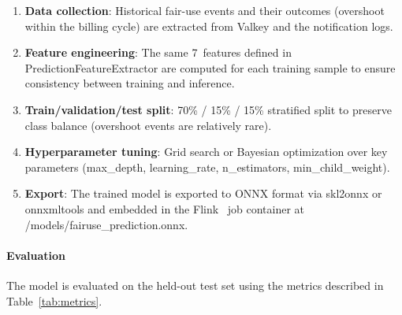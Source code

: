 \begin{enumerate}
    \item \textbf{Data collection}: Historical fair-use events and their outcomes (overshoot within
    the billing cycle) are extracted from Valkey and the notification logs.
    \item \textbf{Feature engineering}: The same 7~features defined in PredictionFeatureExtractor
    are computed for each training sample to ensure consistency between training and inference.
    \item \textbf{Train/validation/test split}: 70\% / 15\% / 15\% stratified split to preserve
    class balance (overshoot events are relatively rare).
    \item \textbf{Hyperparameter tuning}: Grid search or Bayesian optimization over key parameters
    (max\_depth, learning\_rate, n\_estimators, min\_child\_weight).
    \item \textbf{Export}: The trained model is exported to ONNX format via skl2onnx or
    onnxmltools and embedded in the Flink~\cite{FLINK} job container at
    /models/fairuse\_prediction.onnx.
\end{enumerate}

\paragraph{Evaluation}

The model is evaluated on the held-out test set using the metrics described in Table~\ref{tab:metrics}.

